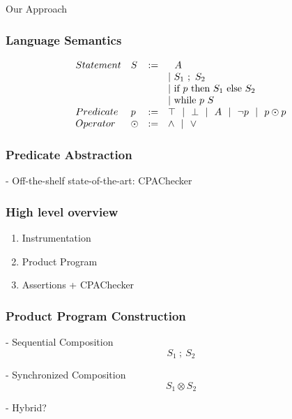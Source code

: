 \documentclass{beamer} %
\theoremstyle{definition} %
\newcommand{\cross}{\otimes{}}
\begin{document}
\begin{frame}
	Our Approach
\end{frame}

\begin{frame}
\frametitle{Language Semantics}

	\[
		\begin{array}{l l c l}
			Statement & S & := & 
				\ \ A \\
				& & & |~ S_1\ ;\ S_2 \\
				& & & |~ \text{if }p\text{ then } S_1 \text{ else } S_2 \\
				& & & |~ \text{while }p\text{ } S \\
			Predicate & p &:=& \top ~~|~~ \bot ~~|~~ A ~~|~~ \lnot p ~~|~~ p \odot p \\
			Operator & \odot &:=& \land ~~|~~ \lor \\
		\end{array}
	\]


\end{frame}

\begin{frame}
\frametitle{Predicate Abstraction}

	- Off-the-shelf state-of-the-art: CPAChecker

\end{frame}

\begin{frame}
\frametitle{High level overview}

	\begin{enumerate}
		\item Instrumentation
		\item Product Program %
		\item Assertions + CPAChecker
	\end{enumerate}

\end{frame}

\begin{frame}
\frametitle{Product Program Construction}

	- Sequential Composition \[S_1\ ;\ S_2\]

	\pause

	- Synchronized Composition \[S_1 \cross S_2\]

	\pause

	- Hybrid?

\end{frame}
\end{document}
